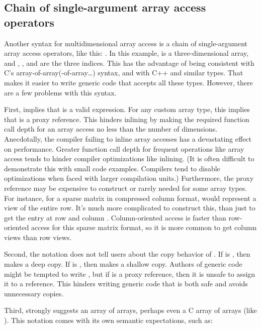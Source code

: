 \documentclass{wg21}
\begin{document}
\subsection{Chain of single-argument array access operators}

Another syntax for multidimensional array access is a chain of single-argument array access operators, like this: .  In this example,  is a three-dimensional array, and , , and  are the three indices.  This has the advantage of being consistent with C's array-of-array(-of-array\ldots) syntax, and with C++  and similar types.  That makes it easier to write generic code that accepts all these types.  However, there are a few problems with this syntax.

First,  implies that  is a valid expression.  For any custom array type, this implies that  is a proxy reference.  This hinders inlining by making the required function call depth for an array access no less than the number of dimensions.  Anecdotally, the compiler failing to inline array accesses has a devastating effect on performance.  Greater function call depth for frequent operations like array access tends to hinder compiler optimizations like inlining.  (It is often difficult to demonstrate this with small code examples.  Compilers tend to disable optimizations when faced with larger compilation units.)  Furthermore, the proxy reference  may be expensive to construct or rarely needed for some array types.  For instance, for a sparse matrix in compressed column format,  would represent a view of the entire row.  It's much more complicated to construct this, than just to get the entry at row  and column .  Column-oriented access is faster than row-oriented access for this sparse matrix format, so it is more common to get column views than row views.

Second, the notation  does not tell users about the copy behavior of .  If  is , then  makes a deep copy.  If  is , then  makes a shallow copy.  Authors of generic code might be tempted to write , but if  is a proxy reference, then it is unsafe to assign it to a reference.  This hinders writing generic code that is both safe and avoids unnecessary copies.

Third,  strongly suggests an array of arrays, perhaps even a C array of arrays (like ).  This notation comes with its own semantic expectations, such as:
\end{document}

